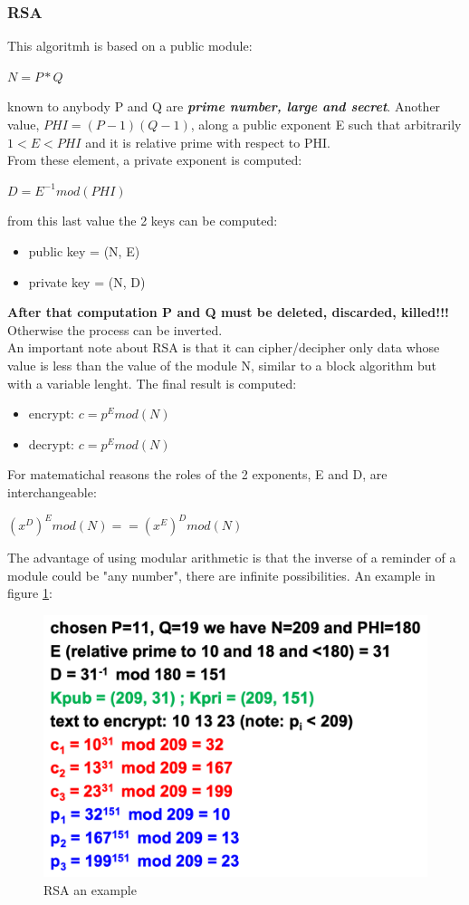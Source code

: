 \documentclass[12pt]{article}
\begin{document}
\subsubsection{RSA}
This algoritmh is based on a public module:
\begin{center}
  \textbf{$N=P * Q$}
\end{center}
known to anybody P and Q are \textbf{\textit{prime number, large and secret}}. Another value, $PHI=(P-1)(Q-1)$, along a public exponent E such that arbitrarily $1<E<PHI$ and it is relative prime with respect to PHI.\\
From these element, a private exponent is computed:
\begin{center}
    $D=E^{-1}mod(PHI)$
\end{center}
from this last value the 2 keys can be computed:
\begin{itemize}
  \item public key = (N, E)
  \item private key = (N, D)
\end{itemize}
\textbf{After that computation P and Q must be deleted, discarded, killed!!!} Otherwise the process can be inverted.\\
An important note about RSA is that it can cipher/decipher only data whose value is less than the value of the module N, similar to a block algorithm but with a variable lenght. The final result is computed:
\begin{itemize}
  \item encrypt: $c = p^E mod(N)$
  \item decrypt: $c = p^E mod(N)$
\end{itemize}
For matematichal reasons the roles of the 2 exponents, E and D, are interchangeable:
\begin{center}
  $(x^D)^E mod(N) == (x^E)^D mod(N)$
\end{center}
The advantage of using modular arithmetic is that the inverse of a reminder of a module could be "any number", there are infinite possibilities. An example in figure \ref{fig:example_rsa}:
\begin{figure}[H]
   \centering
   \includegraphics[width=\linewidth]{images/example_rsa.png}
   \caption{RSA an example}
   \label{fig:example_rsa}
\end{figure}
\end{document}

